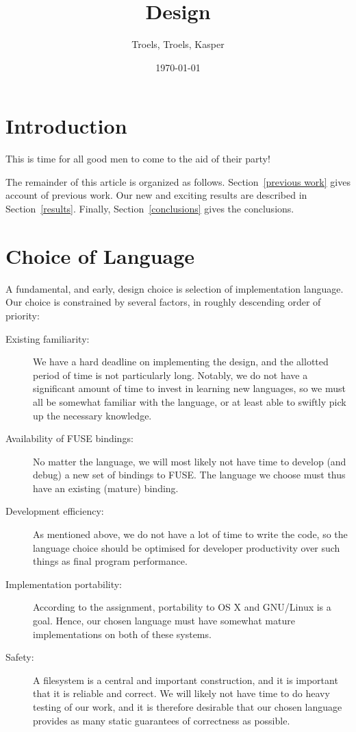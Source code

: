 \documentclass[12pt]{article}
\author{
        Troels, Troels, Kasper
}
\date{\today}
\title{Design}
\begin{document}
 
\maketitle
 
\section{Introduction}
This is time for all good men to come to the aid of their party!
 
 
The remainder of this article is organized as follows.
Section~\ref{previous work} gives account of previous work. Our new
and exciting results are described in Section~\ref{results}. Finally,
Section~\ref{conclusions} gives the conclusions.
 
\section{Choice of Language}
 
A fundamental, and early, design choice is selection of implementation
language. Our choice is constrained by several factors, in roughly
descending order of priority:
 
\begin{description}
\item[Existing familiarity: ] We have a hard deadline on
  implementing the design, and the allotted period of time is not
  particularly long. Notably, we do not have a significant amount of
  time to invest in learning new languages, so we must all be somewhat
  familiar with the language, or at least able to swiftly pick up the
  necessary knowledge.
\item[Availability of FUSE bindings: ] No matter the language, we will
  most likely not have time to develop (and debug) a new set of
  bindings to FUSE. The language we choose must thus have an existing
  (mature) binding.
\item[Development efficiency: ] As mentioned above, we do not have a
  lot of time to write the code, so the language choice should be
  optimised for developer productivity over such things as final
  program performance.
\item[Implementation portability: ] According to the assignment,
  portability to OS X and GNU/Linux is a goal. Hence, our chosen
  language must have somewhat mature implementations on both of these
  systems.
\item[Safety: ] A filesystem is a central and important construction,
  and it is important that it is reliable and correct. We will likely
  not have time to do heavy testing of our work, and it is therefore
  desirable that our chosen language provides as many static
  guarantees of correctness as possible.
\end{description}
 
\end{document}
